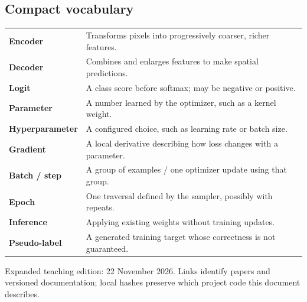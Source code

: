 \documentclass[11pt,letterpaper]{article}
\begin{document}
\subsection*{Compact vocabulary}
{\small
\begin{tabularx}{\linewidth}{@{}lY@{}}\toprule
\textbf{Encoder} & Transforms pixels into progressively coarser, richer features.\\
\textbf{Decoder} & Combines and enlarges features to make spatial predictions.\\
\textbf{Logit} & A class score before softmax; may be negative or positive.\\
\textbf{Parameter} & A number learned by the optimizer, such as a kernel weight.\\
\textbf{Hyperparameter} & A configured choice, such as learning rate or batch size.\\
\textbf{Gradient} & A local derivative describing how loss changes with a parameter.\\
\textbf{Batch / step} & A group of examples / one optimizer update using that group.\\
\textbf{Epoch} & One traversal defined by the sampler, possibly with repeats.\\
\textbf{Inference} & Applying existing weights without training updates.\\
\textbf{Pseudo-label} & A generated training target whose correctness is not guaranteed.\\\bottomrule
\end{tabularx}}

{\small Expanded teaching edition: 22 November 2026. Links identify papers and versioned documentation; local hashes preserve which project code this document describes.}
\end{document}
